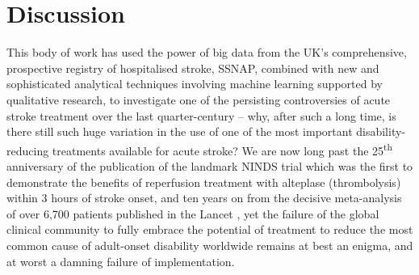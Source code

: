\section{Discussion}

This body of work has used the power of big data from the UK’s comprehensive, prospective registry of hospitalised stroke, SSNAP, combined with new and sophisticated analytical techniques involving machine learning supported by qualitative research, to investigate one of the persisting controversies of acute stroke treatment over the last quarter-century – why, after such a long time, is there still such huge variation in the use of one of the most important disability-reducing treatments available for acute stroke? We are now long past the 25\textsuperscript{th} anniversary of the publication of the landmark NINDS trial which was the first to demonstrate the benefits of reperfusion treatment with alteplase (thrombolysis) within 3 hours of stroke onset, and ten years on from the decisive meta-analysis of over 6,700 patients published in the Lancet \cite{emberson_effect_2014}, yet the failure of the global clinical community to fully embrace the potential of treatment to reduce the most common cause of adult-onset disability worldwide remains at best an enigma, and at worst a damning failure of implementation.

